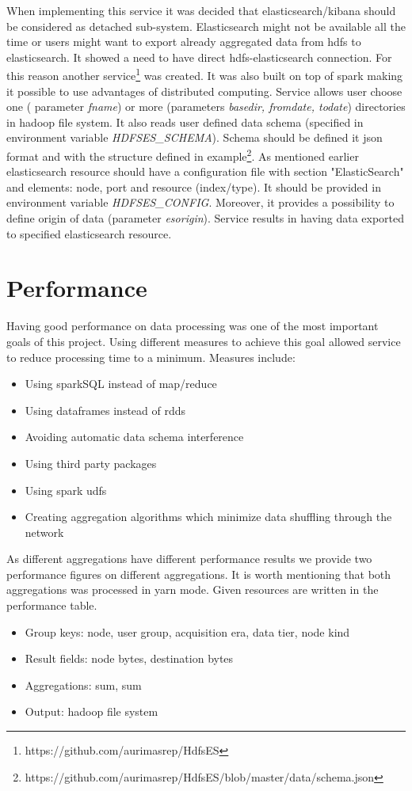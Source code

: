 When implementing this service it was decided that elasticsearch/kibana should be considered as detached sub-system. Elasticsearch might not be available all the time or users 
might want to export already aggregated data from hdfs to elasticsearch. It showed a need to have direct hdfs-elasticsearch connection. For this reason another 
service\footnote{https://github.com/aurimasrep/HdfsES} was created. It was also built on top of spark making it possible to use advantages of distributed computing. Service 
allows user choose one ( parameter \textit{fname}) or more (parameters \textit{basedir, fromdate, todate}) directories in hadoop file system. It also reads user defined 
data schema (specified in environment variable \textit{HDFSES{\_}SCHEMA}). Schema should be defined it json format and with the structure defined in 
example\footnote{https://github.com/aurimasrep/HdfsES/blob/master/data/schema.json}. As mentioned earlier elasticsearch resource should have a configuration file with section 
"ElasticSearch" and elements: node, port and resource (index/type). It should be provided in environment variable \textit{HDFSES{\_}CONFIG}. Moreover, it provides a 
possibility to define origin of data (parameter \textit{esorigin}). Service results in having data exported to specified elasticsearch resource.

\section{Performance}

Having good performance on data processing was one of the most important goals of this project. Using different measures to achieve this goal allowed service to reduce 
processing time to a minimum. Measures include:
\begin{itemize}
\item Using sparkSQL instead of map/reduce
\item Using dataframes instead of rdds
\item Avoiding automatic data schema interference
\item Using third party packages
\item Using spark udfs
\item Creating aggregation algorithms which minimize data shuffling through the network
\end{itemize}
As different aggregations have different performance results we provide two performance figures on different aggregations. It is worth mentioning that both aggregations 
was processed in yarn mode. Given resources are written in the performance table.
\begin{itemize}
\item Group keys: node, user group, acquisition era, data tier, node kind
\item Result fields: node bytes, destination bytes
\item Aggregations: sum, sum
\item Output: hadoop file system
\end{itemize}

